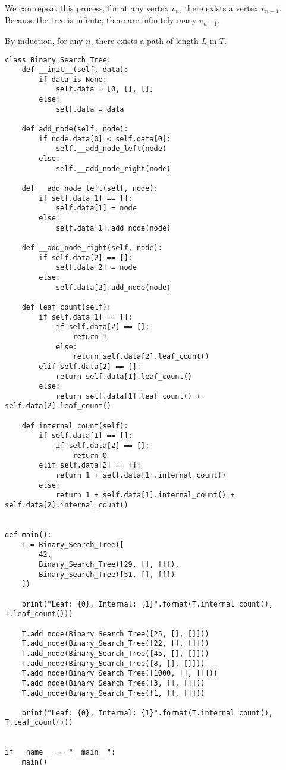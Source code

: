 \documentclass[12pt]{scrartcl}
\begin{document}
We can repeat this process, for at any vertex $v_n$, there exists a vertex $v_{n + 1}$. Because the tree is infinite, there are infinitely many $v_{n + 1}$.

By induction, for any $n$, there exists a path of length $L$ in $T$.

\problem{}
\begin{lstlisting}
class Binary_Search_Tree:
    def __init__(self, data):
        if data is None:
            self.data = [0, [], []]
        else:
            self.data = data

    def add_node(self, node):
        if node.data[0] < self.data[0]:
            self.__add_node_left(node)
        else:
            self.__add_node_right(node)

    def __add_node_left(self, node):
        if self.data[1] == []:
            self.data[1] = node
        else:
            self.data[1].add_node(node)

    def __add_node_right(self, node):
        if self.data[2] == []:
            self.data[2] = node
        else:
            self.data[2].add_node(node)

    def leaf_count(self):
        if self.data[1] == []:
            if self.data[2] == []:
                return 1
            else:
                return self.data[2].leaf_count()
        elif self.data[2] == []:
            return self.data[1].leaf_count()
        else:
            return self.data[1].leaf_count() + self.data[2].leaf_count()

    def internal_count(self):
        if self.data[1] == []:
            if self.data[2] == []:
                return 0
        elif self.data[2] == []:
            return 1 + self.data[1].internal_count()
        else:
            return 1 + self.data[1].internal_count() + self.data[2].internal_count()


def main():
    T = Binary_Search_Tree([
        42,
        Binary_Search_Tree([29, [], []]),
        Binary_Search_Tree([51, [], []])
    ])

    print("Leaf: {0}, Internal: {1}".format(T.internal_count(), T.leaf_count()))

    T.add_node(Binary_Search_Tree([25, [], []]))
    T.add_node(Binary_Search_Tree([22, [], []]))
    T.add_node(Binary_Search_Tree([45, [], []]))
    T.add_node(Binary_Search_Tree([8, [], []]))
    T.add_node(Binary_Search_Tree([1000, [], []]))
    T.add_node(Binary_Search_Tree([3, [], []]))
    T.add_node(Binary_Search_Tree([1, [], []]))

    print("Leaf: {0}, Internal: {1}".format(T.internal_count(), T.leaf_count()))


if __name__ == "__main__":
    main()
\end{lstlisting}
\end{document}
